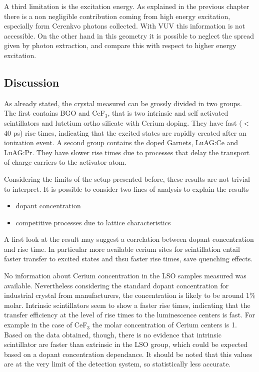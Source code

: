 A third limitation is the excitation energy. As explained in the previous chapter there is a non negligible contribution coming from high energy excitation, especially form Cerenkvo photons collected. With VUV this information is not accessible. On the other hand in this geometry it is possible to neglect the spread given by photon extraction, and compare this with respect to higher energy excitation. 

\subsection{Discussion}
As already stated, the crystal measured can be grossly divided in two groups.
The first contains BGO and CeF$_{3}$, that is two intrinsic and self activated scintillators and lutetium ortho silicate with Cerium doping. They have fast ($<$40 ps) rise times, indicating that the excited states are rapidly created after an ionization event.
A second group contains the doped Garnets, LuAG:Ce and LuAG:Pr. They have slower rise times due to processes that delay the transport of charge carriers to the activator atom.

Considering the limits of the setup presented before, these results are not trivial to interpret.
It is possible to consider two lines of analysis to explain the results 
\begin{itemize}
\item dopant concentration
\item competitive processes due to lattice characteristics
\end{itemize}
A first look at the result may suggest a correlation between dopant concentration and rise time. In particular more available cerium sites for scintillation entail faster transfer to excited states and thsu faster rise times, save quenching effects.

No information about Cerium concentration in the LSO samples measured was available. Nevertheless considering the standard dopant concentration for industrial crystal from manufacturers, the concentration is likely to be around 1$\%$ molar. 
Intrinsic scintillators seem to show a faster rise times, indicating that the transfer efficiency at the level of rise times to the luminescence centers is fast. For example in the case of CeF$_{3}$ the molar concentration of Cerium centers is 1. Based on the data obtained, though, there is no evidence that intrinsic scintillator are faster than extrinsic in the LSO group, which could be expected based on a dopant concentration dependance. It should be noted that this values are at the very limit of the detection system, so statistically less accurate.

